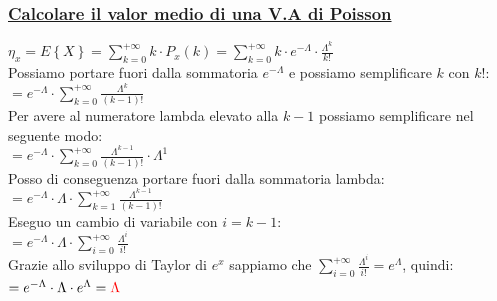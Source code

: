 \documentclass{article}
\begin{document}
\subsubsection{\underline{Calcolare il valor medio di una V.A di Poisson}}
$\eta_x = E \left\{X\right\} = \sum_{k=0}^{+\infty} k \cdot P_x(k) = \sum_{k=0}^{+\infty} k \cdot e^{-\Lambda} \cdot \frac{\Lambda^k}{k!}$ \\
Possiamo portare fuori dalla sommatoria $e^{-\Lambda}$ e possiamo semplificare $k$ con $k!$: \\
$= e^{-\Lambda} \cdot \sum_{k=0}^{+\infty} \frac{\Lambda^k}{(k-1)!}$ \\
Per avere al numeratore lambda elevato alla $k-1$ possiamo semplificare nel seguente modo: \\
$= e^{-\Lambda} \cdot \sum_{k=0}^{+\infty} \frac{\Lambda^{k-1}}{(k-1)!} \cdot \Lambda^1$ \\
Posso di conseguenza portare fuori dalla sommatoria lambda: \\
$= e^{-\Lambda} \cdot \Lambda \cdot \sum_{k=1}^{+\infty} \frac{\Lambda^{k-1}}{(k-1)!} $ \\
Eseguo un cambio di variabile con $i = k-1$: \\
$= e^{-\Lambda} \cdot \Lambda \cdot \sum_{i=0}^{+\infty} \frac{\Lambda^{i}}{i!} $ \\
Grazie allo sviluppo di Taylor di $e^x$ sappiamo che $\sum_{i=0}^{+\infty} \frac{\Lambda^i}{i!} = e^\Lambda$, quindi: \\
$= e^{-\Lambda} \cdot \Lambda \cdot e^{\Lambda} = \color{red} \Lambda$
\end{document}
